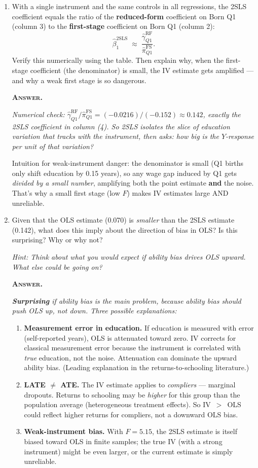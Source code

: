 \documentclass[11pt]{article}
\newcommand{\ans}[1]{%
  \vspace{2pt}%
  {\color{BrickRed}\textsc{\textbf{Answer.}}} {\itshape #1}\par\vspace{4pt}%
}
\begin{document}
\begin{enumerate}
\item With a single instrument and the same controls in all regressions, the 2SLS coefficient equals the ratio of the \textbf{reduced-form} coefficient on Born Q1 (column 3) to the \textbf{first-stage} coefficient on Born Q1 (column 2):
\[
\hat{\beta}_1^{\text{2SLS}} \;\approx\; \frac{\hat{\gamma}_{Q1}^{\text{RF}}}{\hat{\pi}_{Q1}^{\text{FS}}}.
\]
Verify this numerically using the table. Then explain why, when the first-stage coefficient (the denominator) is small, the IV estimate gets amplified --- and why a weak first stage is so dangerous.

\ans{Numerical check: $\hat{\gamma}_{Q1}^{\text{RF}} / \hat{\pi}_{Q1}^{\text{FS}} = (-0.0216)/(-0.152) \approx 0.142$, exactly the 2SLS coefficient in column (4). So 2SLS isolates the slice of education variation that tracks with the instrument, then asks: how big is the $Y$-response per unit of that variation?

Intuition for weak-instrument danger: the denominator is small (Q1 births only shift education by 0.15 years), so any wage gap induced by Q1 gets \textit{divided by a small number}, amplifying both the point estimate \textbf{and} the noise. That's why a small first stage (low $F$) makes IV estimates large AND unreliable.}

\item  Given that the OLS estimate (0.070) is \textit{smaller} than the 2SLS estimate (0.142), what does this imply about the direction of bias in OLS? Is this surprising? Why or why not?

\textit{Hint: Think about what you would expect if ability bias drives OLS upward. What else could be going on?}

\ans{\textbf{Surprising} if ability bias is the main problem, because ability bias should push OLS \textit{up}, not down. Three possible explanations:
\begin{enumerate}
\def\labelenumi{\arabic{enumi}.}
\item \textbf{Measurement error in education.} If education is measured with error (self-reported years), OLS is attenuated toward zero. IV corrects for classical measurement error because the instrument is correlated with \textit{true} education, not the noise. Attenuation can dominate the upward ability bias. (Leading explanation in the returns-to-schooling literature.)
\item \textbf{LATE $\neq$ ATE.} The IV estimate applies to \textit{compliers} --- marginal dropouts. Returns to schooling may be \textit{higher} for this group than the population average (heterogeneous treatment effects). So IV~$>$~OLS could reflect higher returns for compliers, not a downward OLS bias.
\item \textbf{Weak-instrument bias.} With $F = 5.15$, the 2SLS estimate is itself biased toward OLS in finite samples; the true IV (with a strong instrument) might be even larger, or the current estimate is simply unreliable.
\end{enumerate}}


\end{enumerate}
\end{document}
